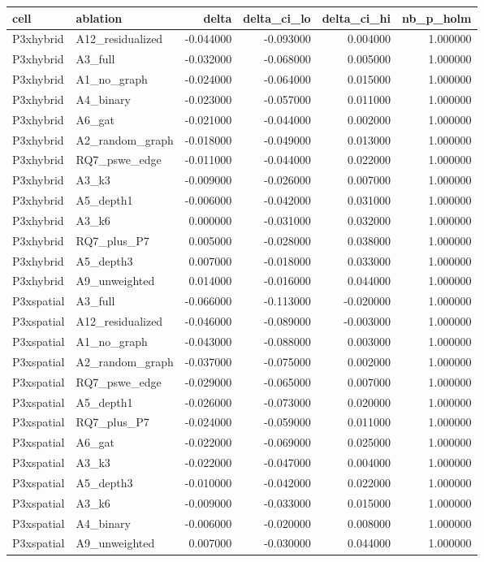 \begin{tabular}{llrrrr}
\toprule
cell & ablation & delta & delta_ci_lo & delta_ci_hi & nb_p_holm \\
\midrule
P3xhybrid & A12_residualized & -0.044000 & -0.093000 & 0.004000 & 1.000000 \\
P3xhybrid & A3_full & -0.032000 & -0.068000 & 0.005000 & 1.000000 \\
P3xhybrid & A1_no_graph & -0.024000 & -0.064000 & 0.015000 & 1.000000 \\
P3xhybrid & A4_binary & -0.023000 & -0.057000 & 0.011000 & 1.000000 \\
P3xhybrid & A6_gat & -0.021000 & -0.044000 & 0.002000 & 1.000000 \\
P3xhybrid & A2_random_graph & -0.018000 & -0.049000 & 0.013000 & 1.000000 \\
P3xhybrid & RQ7_pswe_edge & -0.011000 & -0.044000 & 0.022000 & 1.000000 \\
P3xhybrid & A3_k3 & -0.009000 & -0.026000 & 0.007000 & 1.000000 \\
P3xhybrid & A5_depth1 & -0.006000 & -0.042000 & 0.031000 & 1.000000 \\
P3xhybrid & A3_k6 & 0.000000 & -0.031000 & 0.032000 & 1.000000 \\
P3xhybrid & RQ7_plus_P7 & 0.005000 & -0.028000 & 0.038000 & 1.000000 \\
P3xhybrid & A5_depth3 & 0.007000 & -0.018000 & 0.033000 & 1.000000 \\
P3xhybrid & A9_unweighted & 0.014000 & -0.016000 & 0.044000 & 1.000000 \\
P3xspatial & A3_full & -0.066000 & -0.113000 & -0.020000 & 1.000000 \\
P3xspatial & A12_residualized & -0.046000 & -0.089000 & -0.003000 & 1.000000 \\
P3xspatial & A1_no_graph & -0.043000 & -0.088000 & 0.003000 & 1.000000 \\
P3xspatial & A2_random_graph & -0.037000 & -0.075000 & 0.002000 & 1.000000 \\
P3xspatial & RQ7_pswe_edge & -0.029000 & -0.065000 & 0.007000 & 1.000000 \\
P3xspatial & A5_depth1 & -0.026000 & -0.073000 & 0.020000 & 1.000000 \\
P3xspatial & RQ7_plus_P7 & -0.024000 & -0.059000 & 0.011000 & 1.000000 \\
P3xspatial & A6_gat & -0.022000 & -0.069000 & 0.025000 & 1.000000 \\
P3xspatial & A3_k3 & -0.022000 & -0.047000 & 0.004000 & 1.000000 \\
P3xspatial & A5_depth3 & -0.010000 & -0.042000 & 0.022000 & 1.000000 \\
P3xspatial & A3_k6 & -0.009000 & -0.033000 & 0.015000 & 1.000000 \\
P3xspatial & A4_binary & -0.006000 & -0.020000 & 0.008000 & 1.000000 \\
P3xspatial & A9_unweighted & 0.007000 & -0.030000 & 0.044000 & 1.000000 \\
\bottomrule
\end{tabular}
